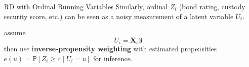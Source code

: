 \begin{frame}{RD with Ordinal Running Variables}
     Similarly, ordinal $Z_i$ {\footnotesize(bond rating, custody security score, etc.)} can be seen as a noisy measurement of a latent variable $U_i$.

     \citet{li2021regression} assume 
     $$
        U_i = \mathbf{X}_i \mathbf{\beta}
     $$
     then use \textcolor{mygreen}{\textbf{inverse-propensity weighting}} with estimated propensities $e(u)=\mathbb{P}\left[ Z_i\geq c\mid U_i=u \right]$ for inference.


\end{frame}